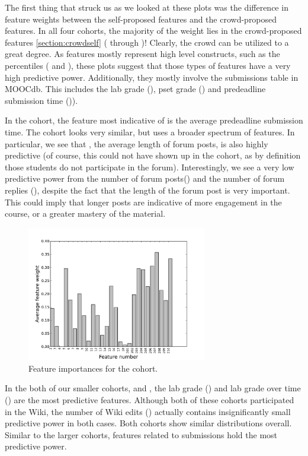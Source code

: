 \begin{paragraph}
The first thing that struck us as we looked at these plots was the difference in feature weights between the self-proposed features and the crowd-proposed features. In all four cohorts, the majority of the weight lies in the crowd-proposed features \ref{section:crowdself} ( through )! Clearly, the crowd can be utilized to a great degree. As features mostly represent high level constructs, such as the percentiles ( and ), these plots suggest that those types of features have a very high predictive power. Additionally, they mostly involve the submissions table in MOOCdb. This includes the lab grade (), pset grade () and predeadline submission time ()).

In the \neither cohort, the feature most indicative of \sti is the average predeadline submission time. The \forum cohort looks very similar, but uses a broader spectrum of features. In particular, we see that , the average length of forum posts, is also highly predictive (of course, this could not have shown up in the \neither cohort, as by definition those students do not participate in the forum). Interestingly, we see a very low predictive power from the number of forum posts() and the number of forum replies (), despite the fact that the length of the forum post is very important. This could imply that longer posts are indicative of more engagement in the course, or a greater mastery of the material.

\begin{figure}[ht!]
  \caption{Feature importances for the \forum cohort.}\label{fig:randomized_logistic_regression_forum_only}
  \centering
    \includegraphics[width=0.7\textwidth]{figures/logreg/randomized_forum_only.png}
\end{figure}

In the both of our smaller cohorts, \both and \wiki, the lab grade () and lab grade over time () are the most predictive features. Although both of these cohorts participated in the Wiki, the number of Wiki edits () actually contains insignificantly small predictive power in both cases. Both cohorts show similar distributions overall. Similar to the larger cohorts, features related to submissions hold the most predictive power.


\end{paragraph}

